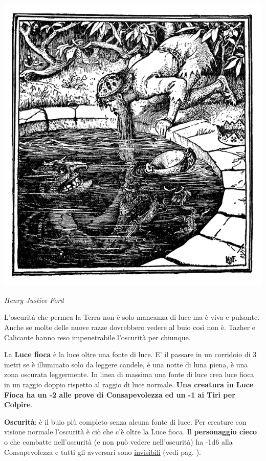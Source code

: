 \begin{multicols}{2}
\begin{center}
\includegraphics[width=0.8\linewidth]{immagini/oscurita.png}

\emph{Henry Justice Ford}
\end{center}

\begin{changemargin}{0.3cm}{0.3cm}\begin{tcolorbox}[title = Visione Crepuscolare e Scurovisione ?]{
L'oscurità che permea la Terra non è solo mancanza di luce ma è viva e pulsante. Anche se molte delle nuove razze dovrebbero vedere al buio così non è. Tazher e Calicante hanno reso impenetrabile l'oscurità per chiunque.
}\end{tcolorbox}\end{changemargin}

\medskip

La \textbf{Luce fioca} è la luce oltre una fonte di luce. E' il passare in un corridoio di 3 metri se è illuminato solo da leggere candele, è una notte di luna piena, è una zona oscurata leggermente.
In linea di massima una fonte di luce crea luce fioca in un raggio doppio rispetto al raggio di luce normale. \textbf{Una creatura in Luce Fioca ha un -2 alle prove di Consapevolezza ed un -1 ai Tiri per Colpire}.

\medskip

\textbf{Oscurità}: è il buio più completo senza alcuna fonte di luce. Per creature con visione normale l'oscurità è ciò che c'è oltre la Luce fioca.
Il \textbf{personaggio cieco} o che combatte nell'oscurità (e non può vedere nell'oscurità) ha -1d6 alla Consapevolezza e tutti gli avversari sono \hyperlink{invisibilita}{invisibili} (vedi pag. \pageref{invisibilita}).


\end{multicols}
